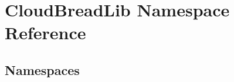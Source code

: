 \hypertarget{namespace_cloud_bread_lib}{}\section{Cloud\+Bread\+Lib Namespace Reference}
\label{namespace_cloud_bread_lib}
\subsection*{Namespaces}
\begin{DoxyCompactItemize}
\end{DoxyCompactItemize}
